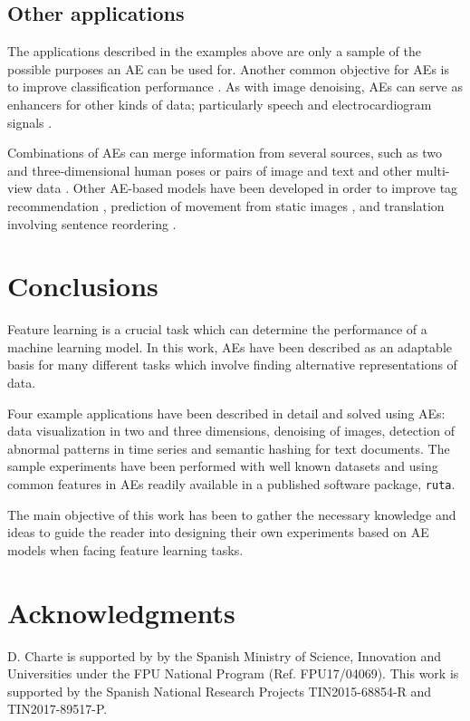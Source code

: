 \subsection{Other applications}
\label{p4sec.other}

The applications described in the examples above are only a sample of the possible purposes an AE can be used for. Another common objective for AEs is to improve classification performance \cite{ssae,xu2017}. As with image denoising, AEs can serve as enhancers for other kinds of data; particularly speech \cite{speech} and electrocardiogram signals \cite{ecg}.

Combinations of AEs can merge information from several sources, such as two and three-dimensional human poses \cite{multimodal} or pairs of image and text and other multi-view data \cite{advcae}. Other AE-based models have been developed in order to improve tag recommendation \cite{rsdae}, prediction of movement from static images \cite{uncertain}, and translation involving sentence reordering \cite{translation}.

\section{Conclusions}
\label{p4sec.conclusions}

Feature learning is a crucial task which can determine the performance of a machine learning model. In this work, AEs have been described as an adaptable basis for many different tasks which involve finding alternative representations of data. 

Four example applications have been described in detail and solved using AEs: data visualization in two and three dimensions, denoising of images, detection of abnormal patterns in time series and semantic hashing for text documents. The sample experiments have been performed with well known datasets and using common features in AEs readily available in a published software package, \texttt{ruta}.

The main objective of this work has been to gather the necessary knowledge and ideas to guide the reader into designing their own experiments based on AE models when facing feature learning tasks.

\section*{Acknowledgments}
D. Charte is supported by by the Spanish Ministry of Science, Innovation and Universities under the FPU National Program (Ref. FPU17/04069). This work is supported by the Spanish National Research Projects TIN2015-68854-R and TIN2017-89517-P.

